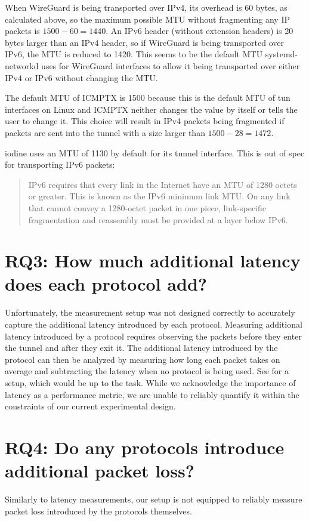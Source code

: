 When WireGuard is being transported over IPv4, its overhead is 60 bytes, as calculated above, so the maximum possible MTU without fragmenting any IP packets is $1500 - 60 = 1440$.
An IPv6 header (without extension headers) is 20 bytes larger than an IPv4 header, so if WireGuard is being transported over IPv6, the MTU is reduced to 1420.
This seems to be the default MTU systemd-networkd uses for WireGuard interfaces to allow it being transported over either IPv4 or IPv6 without changing the MTU.

The default MTU of ICMPTX is 1500 because this is the default MTU of tun interfaces on Linux and ICMPTX neither changes the value by itself or tells the user to change it.
This choice will result in IPv4 packets being fragmented if packets are sent into the tunnel with a size larger than $1500 - 28 = 1472$.

iodine uses an MTU of 1130 by default for its tunnel interface.
This is out of spec for transporting IPv6 packets:
\blockquote[\cite{RFC8200}]{IPv6 requires that every link in the Internet have an MTU of 1280 octets or greater.
This is known as the IPv6 minimum link MTU.
On any link that cannot convey a 1280-octet packet in one piece, link-specific fragmentation and reassembly must be provided at a layer below IPv6.}



\section{RQ3: How much additional latency does each protocol add?}
Unfortunately, the measurement setup was not designed correctly to accurately capture the additional latency introduced by each protocol.
Measuring additional latency introduced by a protocol requires observing the packets before they enter the tunnel and after they exit it.
The additional latency introduced by the protocol can then be analyzed by measuring how long each packet takes on average and subtracting the latency when no protocol is being used.
See  for a setup, which would be up to the task.
While we acknowledge the importance of latency as a performance metric, we are unable to reliably quantify it within the constraints of our current experimental design.

\section{RQ4: Do any protocols introduce additional packet loss?}
Similarly to latency measurements, our setup is not equipped to reliably measure packet loss introduced by the protocols themselves.


